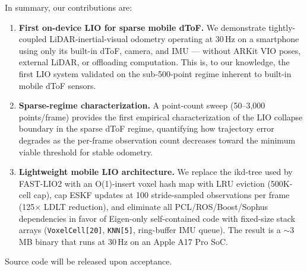 In summary, our contributions are:

\begin{enumerate}
    \item \textbf{First on-device LIO for sparse mobile dToF.}
    We demonstrate tightly-coupled LiDAR-inertial-visual odometry
    operating at 30\,Hz on a smartphone using only its built-in dToF,
    camera, and IMU — without ARKit VIO poses, external LiDAR, or
    offloading computation.
    This is, to our knowledge, the first LIO system validated on the
    sub-500-point regime inherent to built-in mobile dToF sensors.

    \item \textbf{Sparse-regime characterization.}
    A point-count sweep (50--3{,}000 points/frame) provides the first
    empirical characterization of the LIO collapse boundary in the
    sparse dToF regime, quantifying how trajectory error degrades as
    the per-frame observation count decreases toward the minimum viable
    threshold for stable odometry.

    \item \textbf{Lightweight mobile LIO architecture.}
    We replace the ikd-tree used by FAST-LIO2 with an O(1)-insert
    voxel hash map with LRU eviction (500K-cell cap), cap ESKF updates
    at 100 stride-sampled observations per frame (125$\times$ LDLT
    reduction), and eliminate all PCL/ROS/Boost/Sophus dependencies
    in favor of Eigen-only self-contained code with fixed-size
    stack arrays (\texttt{VoxelCell[20]}, \texttt{KNN[5]},
    ring-buffer IMU queue).
    The result is a ${\sim}$3\,MB binary that runs at 30\,Hz on an
    Apple A17 Pro SoC.
\end{enumerate}

Source code will be released upon acceptance.
